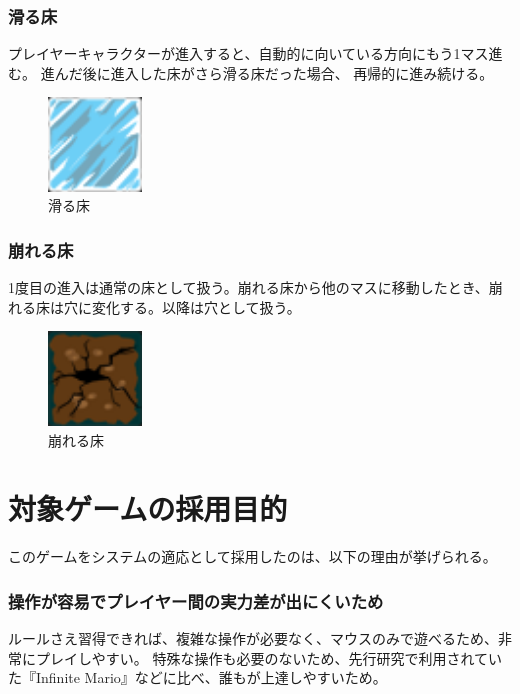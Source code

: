 \subsubsection{滑る床}
プレイヤーキャラクターが進入すると、自動的に向いている方向にもう1マス進む。
進んだ後に進入した床がさら滑る床だった場合、
再帰的に進み続ける。

\begin{figure}[htbp]
  \begin{center}
    \includegraphics[bb=0 0 24 24, width=2.5cm]{images/ice.png}
  \end{center}
  \caption{滑る床}
  \label{fig:one}
\end{figure}

\subsubsection{崩れる床}
1度目の進入は通常の床として扱う。崩れる床から他のマスに移動したとき、崩れる床は穴に変化する。以降は穴として扱う。

\begin{figure}[htbp]
  \begin{center}
    \includegraphics[bb=0 0 24 24, width=2.5cm]{images/broken.png}
  \end{center}
  \caption{崩れる床}
  \label{fig:one}
\end{figure}

\section{対象ゲームの採用目的}
このゲームをシステムの適応として採用したのは、以下の理由が挙げられる。
\subsubsection{操作が容易でプレイヤー間の実力差が出にくいため}
ルールさえ習得できれば、複雑な操作が必要なく、マウスのみで遊べるため、非常にプレイしやすい。
特殊な操作も必要のないため、先行研究で利用されていた『Infinite Mario』などに比べ、誰もが上達しやすいため。

